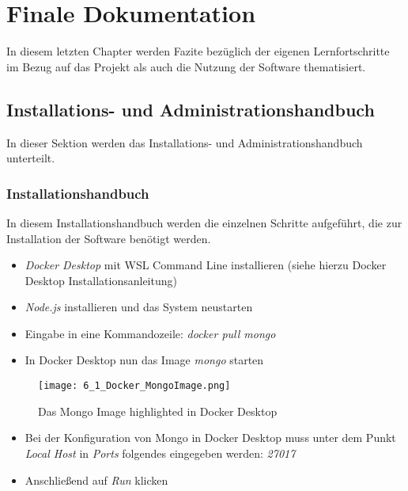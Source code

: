 \chapter{Finale Dokumentation}

In diesem letzten Chapter werden Fazite bezüglich der eigenen Lernfortschritte im Bezug auf das Projekt als auch die Nutzung der Software thematisiert.

\section{Installations- und Administrationshandbuch}

In dieser Sektion werden das Installations- und Administrationshandbuch unterteilt.

\subsection{Installationshandbuch}

In diesem Installationshandbuch werden die einzelnen Schritte aufgeführt, die zur Installation der Software benötigt werden.

\begin{itemize}
    \item   \textit{Docker Desktop} mit WSL Command Line installieren (siehe hierzu Docker Desktop Installationsanleitung)
    \item   \textit{Node.js} installieren und das System neustarten
    \item   Eingabe in eine Kommandozeile: \textit{docker pull mongo}
    \item   In Docker Desktop nun das Image \textit{mongo} starten
\end{itemize}

\begin{figure}[!h]
    \centering
    \texttt{[image: 6\_1\_Docker\_MongoImage.png]}
    \caption{Das Mongo Image highlighted in Docker Desktop}
    \label{fig:DockerMongoImage}
\end{figure}

\begin{itemize}
    \item   Bei der Konfiguration von Mongo in Docker Desktop muss unter dem Punkt \textit{Local Host} in \textit{Ports} folgendes eingegeben werden: \textit{27017}
    \item   Anschließend auf \textit{Run} klicken 
\end{itemize}

